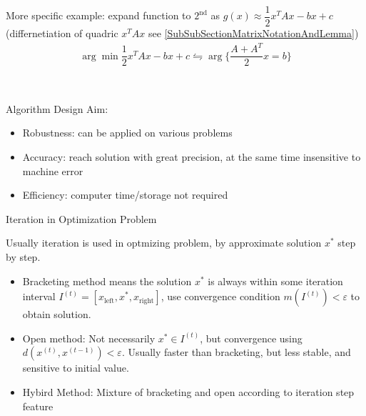     More specific example: expand function to $ 2^\mathrm{nd}  $ as $ g(x)\approx\dfrac{1}{2}x^TAx-bx+c $ (differnetiation of quadric $ x^TAx $ see \autoref{SubSubSectionMatrixNotationAndLemma})
    \begin{align}
        \arg\min\dfrac{1}{2}x^TAx-bx+c\leftrightharpoons \arg\{\dfrac{A+A^T}{2}x=b\}
    \end{align}


    \\
    
    
\begin{point}
    Algorithm Design Aim:
\end{point}

\begin{itemize}[topsep=2pt,itemsep=0pt]
    \item Robustness: can be applied on various problems
    \item Accuracy: reach solution with great precision, at the same time insensitive to machine error
    \item Efficiency: computer time/storage not required
\end{itemize}

\begin{point}
    Iteration in Optimization Problem
\end{point}

    Usually iteration is used in optmizing problem, by approximate solution $ x^* $ step by step. 
\begin{itemize}[topsep=2pt,itemsep=0pt]
    \item Bracketing method means the solution $ x^* $ is always within some iteration interval $ I^{(t)}=[x_\mathrm{left},x^*,x_\mathrm{right}  ] $, use convergence condition $ m(I^{(t)})<\varepsilon  $ to obtain solution.
    
    \item Open method: Not necessarily $ x^*\in I^{(t)} $, but convergence using $ d(x^{(t)},x^{(t-1)})<\varepsilon  $. Usually faster than bracketing, but less stable, and sensitive to initial value.
    
    \item Hybird Method: Mixture of bracketing and open according to iteration step feature
    
\end{itemize}







